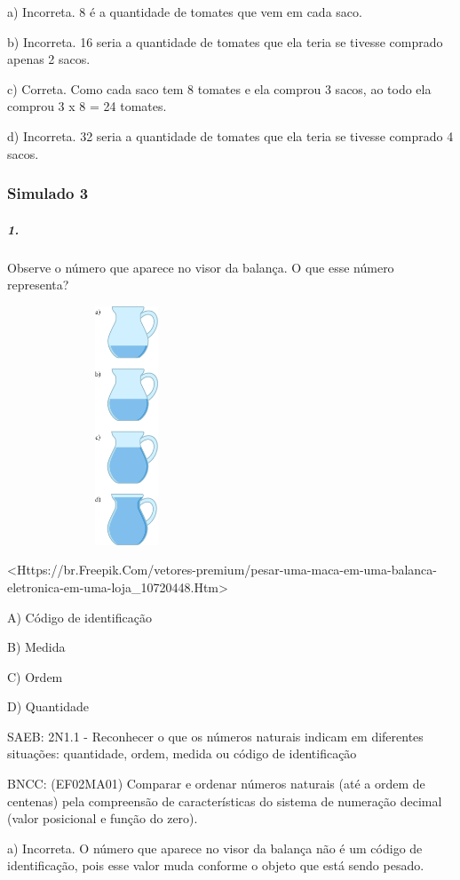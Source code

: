 a) Incorreta. 8 é a quantidade de tomates que vem em cada saco.

b) Incorreta. 16 seria a quantidade de tomates que ela teria se tivesse
comprado apenas 2 sacos.

c) Correta. Como cada saco tem 8 tomates e ela comprou 3 sacos, ao todo
ela comprou 3 x 8 = 24 tomates.

d) Incorreta. 32 seria a quantidade de tomates que ela teria se tivesse
comprado 4 sacos.

\subsubsection{Simulado 3}\label{simulado-3}

\subparagraph{1. }\label{section-130}

Observe o número que aparece no visor da balança. O que esse número
representa?

\includegraphics[width=2.80208in,height=2.80208in]{media/image141.png}

\textless{}Https://br.Freepik.Com/vetores-premium/pesar-uma-maca-em-uma-balanca-eletronica-em-uma-loja\_10720448.Htm\textgreater{}

A) Código de identificação

B) Medida

C) Ordem

D) Quantidade

SAEB: 2N1.1 - Reconhecer o que os números naturais indicam em diferentes
situações: quantidade, ordem, medida ou código de identificação

BNCC: (EF02MA01) Comparar e ordenar números naturais (até a ordem de
centenas) pela compreensão de características do sistema de numeração
decimal (valor posicional e função do zero).

a) Incorreta. O número que aparece no visor da balança não é um código
de identificação, pois esse valor muda conforme o objeto que está sendo
pesado.

